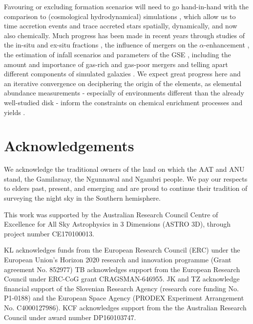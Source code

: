 \documentclass[fleqn,usenatbib]{mnras}
\begin{document}
Favouring or excluding formation scenarios will need to go hand-in-hand with the comparison to (cosmological hydrodynamical) simulations \citep[e.g.][]{Mackereth2018, Bonaca2017, Wu2021}, which allow us to time accretion events and trace accreted stars spatially, dynamically, and now also chemically. Much progress has been made in recent years through studies of the in-situ and ex-situ fractions \citep[e.g.][]{Pillepich2015}, the influence of mergers on the $\alpha$-enhancement \citep[e.g.][]{Zolotov2010, Grand2020, Buck2020, Renaud2021}, the estimation of infall scenarios and parameters of the GSE \citep[e.g.][]{Villalobos2008, Koppelman2021, Naidu2021}, including the amount and importance of gas-rich and gas-poor mergers \citep[e.g.][]{Fensch2017, Renaud2021b} and telling apart different components of simulated galaxies \citep[e.g.][]{Obreja2019}. We expect great progress here and an iterative convergence on deciphering the origin of the elements, as elemental abundance measurements - especially of environments different than the already well-studied disk - inform the constraints on chemical enrichment processes and yields \citep[e.g.][]{FernandezAlvar2018b, Vincenzo2019, Eitner2020, Sanders2021, Ishigaki2021}.

\section*{Acknowledgements}

We acknowledge the traditional owners of the land on which the AAT and ANU stand, the Gamilaraay, the Ngunnawal and Ngambri people. We pay our respects to elders past, present, and emerging and are proud to continue their tradition of surveying the night sky in the Southern hemisphere.

This work was supported by the Australian Research Council Centre of Excellence for All Sky Astrophysics in 3 Dimensions (ASTRO 3D), through project number CE170100013.

KL acknowledges funds from the European Research Council (ERC) under the European Union's Horizon 2020 research and innovation programme (Grant agreement No. 852977)
TB acknowledges support from the European Research Council under ERC-CoG grant CRAGSMAN-646955.
JK and TZ acknowledge financial support of the Slovenian Research Agency (research core funding No. P1-0188) and the European Space Agency (PRODEX Experiment Arrangement No. C4000127986).
KCF acknowledges support from the the Australian Research Council under award number DP160103747.
\end{document}
